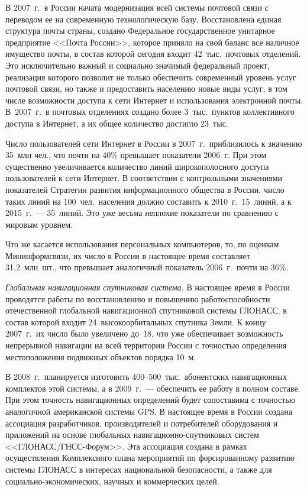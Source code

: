 \begin{multicols}{2}
     В 2007~г.\ в России начата модернизация всей сис\-те\-мы почтовой связи с переводом
ее на современную технологическую базу. Восстановлена единая структура почты страны,
создано Федеральное государственное унитарное предприятие <<Почта России>>,
которое приняло на свой баланс все наличное имущество почты, в состав которой сегодня
входит 42~тыс.\ почтовых отделений. Это исключительно важный и социально значимый
федеральный проект, реализация которого позволит не только обеспечить современный
уровень услуг почтовой связи, но также и предоставить населению новые виды услуг, в
том числе возможности доступа к сети Интернет и использования электронной поч\-ты.
В~2007~г.\ в почтовых отделениях создано более 3~тыс.\ пунктов коллективного доступа в
Интернет, а их общее количество достигло 23~тыс.

     Число пользователей сети Интернет в России в 2007~г.\ приблизилось к значению
35~млн чел., что почти на 40\% превышает показатели 2006~г. При этом существенно
увеличивается количество линий широкополосного доступа пользователей к сети
Интернет. В соответствии с контрольными значениями показателей Стратегии развития
информационного общества в России, число таких линий на 100~чел.\ населения
должно составить к 2010~г.\ 15~линий, а к 2015~г.~--- 35~линий. Это уже весьма
неплохие показатели по сравнению с мировым уровнем.

     Что же касается использования персональных компьютеров, то, по оценкам
Мининформсвязи, их число в России в настоящее время составляет 31,2~млн~шт., что
превышает аналогичный показатель 2006~г.\ почти на 36\%.

     \vspace*{1pt}
     \textit{Глобальная навигационная спутниковая система.} В настоящее время в
России проводятся работы по восстановлению и повышению работоспособности
отечественной глобальной навигационной спутниковой системы ГЛОНАСС, в состав
которой входит 24~высокоорбитальных спутника Земли. К концу 2007~г.\ их число было
увеличено до~18, что уже обеспечивает возможность непрерывной навигации на всей
территории России с точностью определения местоположения подвижных объектов
порядка 10~м.

     В 2008~г.\ планируется изготовить 400--500~тыс.\ абонентских навигационных
комплектов этой сис\-те\-мы, а в 2009~г.~--- обеспечить ее работу в полном составе. При
этом точность навигационных определений будет сопоставима с точностью аналогичной
американской системы GPS. В настоящее время в России создана ассоциация
разработчиков, производителей и потребителей оборудования и приложений на основе
глобальных навигационно-спут\-ни\-ко\-вых систем <<ГЛОНАСС/ГНСС-Форум>>. Эта
ассоциация создана в рамках осуществления Комплексного плана мероприятий по
форсированному развитию системы ГЛОНАСС в интересах национальной безопасности, а
также для социально-эко\-но\-ми\-че\-ских, научных и коммерческих целей.


\end{multicols}
